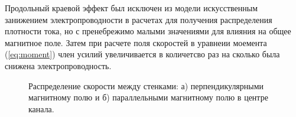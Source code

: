 Продольный краевой эффект был исключен из модели искусственным занижением электропроводности в расчетах для получения распределения плотности тока, но с пренебрежимо малыми значениями для влияния на общее магнитное поле. Затем при расчете поля скоростей в уравнеии моемента (\ref{eq:moment}) член усилий увеличивается в количетсво раз  на сколько была снижена электропроводность.

\begin{figure}[b]
	\caption{Распределение скорости между стенками: а) перпендикулярными магнитному полю и б) параллельными магнитному полю в центре канала.}
	\label{fig:velocity:ideal}
\end{figure}

